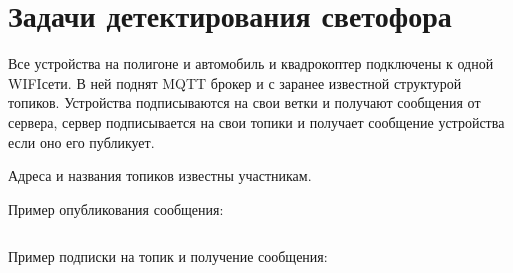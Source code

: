 \section{Задачи детектирования светофора}

Все устройства на полигоне и автомобиль и квадрокоптер подключены к одной WIFIсети. В ней поднят MQTT брокер и с заранее известной структурой топиков. Устройства подписываются на свои ветки и получают сообщения от сервера, сервер подписывается на свои топики и получает сообщение устройства если оно его публикует.

Адреса и названия топиков известны участникам.

Пример опубликования сообщения:

\inputminted[fontsize=\footnotesize, linenos]{python}{final/command_tour/ats/task_06/source_1.py}

Пример подписки на топик и получение сообщения:

\inputminted[fontsize=\footnotesize, linenos]{python}{final/command_tour/ats/task_06/source_2.py}